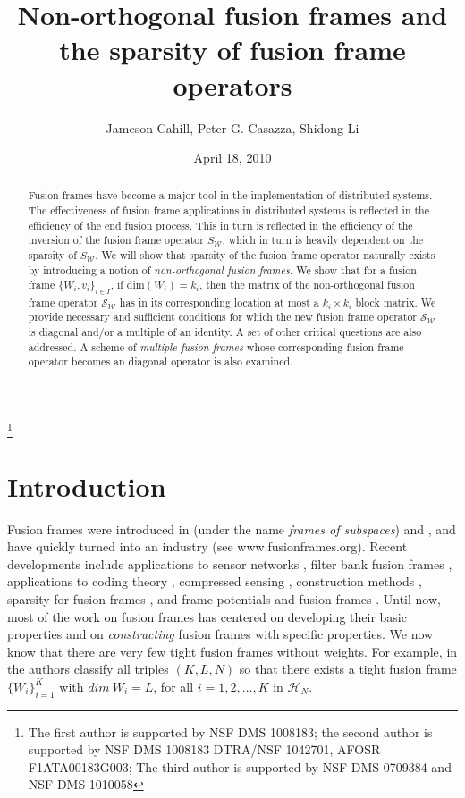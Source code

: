 \documentclass[11pt,reqno]{amsart}
\title[Non-orthogonal Fusion Frames]
{Non-orthogonal fusion frames and the sparsity of fusion frame operators}
\author[Cahill, Casazza, Li]{Jameson Cahill,  Peter G. Casazza, Shidong Li}
\date{\empty}
\theoremstyle{remark}
\begin{document}
\begin{abstract}
Fusion frames have become a major tool in the implementation of distributed systems.
The effectiveness of fusion frame applications in distributed systems is reflected in the efficiency of the end fusion process.  This in turn is reflected in the efficiency of the inversion of the fusion frame operator $S_{{\mathcal W}}$, which in turn is heavily dependent on the sparsity of $S_{{\mathcal W}}$.
We will show that sparsity of the fusion frame operator
naturally exists by introducing a notion of {\it non-orthogonal fusion frames}.
We show that for a fusion frame $\{W_i,v_i\}_{i\in I}$,
if $\text{dim}(W_i)=k_i$, then the matrix of the non-orthogonal fusion frame operator
${{\mathcal S}_{{\mathcal W}}}$ has in its corresponding location at most a $k_i\times k_i$ block matrix.   We provide necessary and sufficient conditions for which the new fusion frame operator ${{\mathcal S}_{{\mathcal W}}}$ is diagonal and/or a multiple of an identity.  A set of other critical questions are also addressed.  A scheme of {\it multiple fusion frames} whose corresponding fusion frame operator becomes an diagonal operator is also examined.
\end{abstract}

\date{April 18, 2010}
\thanks{The first author is supported by NSF DMS 1008183; the
second author is supported by NSF DMS 1008183
DTRA/NSF 1042701, AFOSR F1ATA00183G003; The third author is supported by NSF DMS 0709384 and NSF DMS 1010058}

\maketitle

\section{Introduction}

Fusion frames were introduced in \cite{CK04} (under the name {\it frames of subspaces}) and \cite{CKL08}, and have quickly turned into an industry (see www.fusionframes.org).  Recent developments include applications to sensor networks \cite{CKLR07}, filter bank fusion frames
\cite{CFM10}, applications to coding theory \cite{BK09}, compressed sensing \cite{BKR09}, construction methods \cite{CCHKP10, CCHKP09,CFMWZ10,CFMWZ09,CFMWZ10A}, sparsity for fusion frames \cite{CHKK10}, and frame potentials and fusion frames \cite{MRS10}.
Until now, most of the work on fusion frames has centered on
developing their basic properties and on {\it constructing}
fusion frames with specific properties.  We now know that there are very few tight fusion
frames without weights.  For example, in \cite{CFMWZ10} the authors classify all
triples $(K,L,N)$ so that there exists a tight fusion frame $\{W_i\}_{i=1}^K$
with $dim\ W_i = L$, for all $i=1,2,\ldots,K$ in ${\mathcal H}_N$.
\end{document}
